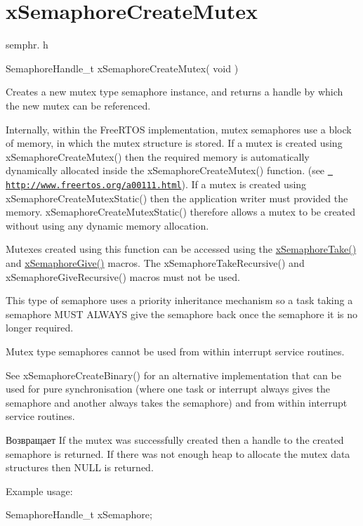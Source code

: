 \hypertarget{group__x_semaphore_create_mutex}{}\section{x\+Semaphore\+Create\+Mutex}
\label{group__x_semaphore_create_mutex}
semphr. h 
\begin{DoxyPre}SemaphoreHandle\_t xSemaphoreCreateMutex( void )\end{DoxyPre}


Creates a new mutex type semaphore instance, and returns a handle by which the new mutex can be referenced.

Internally, within the Free\+R\+T\+OS implementation, mutex semaphores use a block of memory, in which the mutex structure is stored. If a mutex is created using x\+Semaphore\+Create\+Mutex() then the required memory is automatically dynamically allocated inside the x\+Semaphore\+Create\+Mutex() function. (see \href{http://www.freertos.org/a00111.html}{\texttt{ http\+://www.\+freertos.\+org/a00111.\+html}}). If a mutex is created using x\+Semaphore\+Create\+Mutex\+Static() then the application writer must provided the memory. x\+Semaphore\+Create\+Mutex\+Static() therefore allows a mutex to be created without using any dynamic memory allocation.

Mutexes created using this function can be accessed using the \mbox{\hyperlink{semphr_8h_af116e436d2a5ae5bd72dbade2b5ea930}{x\+Semaphore\+Take()}} and \mbox{\hyperlink{semphr_8h_aae55761cabfa9bf85c8f4430f78c0953}{x\+Semaphore\+Give()}} macros. The x\+Semaphore\+Take\+Recursive() and x\+Semaphore\+Give\+Recursive() macros must not be used.

This type of semaphore uses a priority inheritance mechanism so a task \textquotesingle{}taking\textquotesingle{} a semaphore M\+U\+ST A\+L\+W\+A\+YS \textquotesingle{}give\textquotesingle{} the semaphore back once the semaphore it is no longer required.

Mutex type semaphores cannot be used from within interrupt service routines.

See x\+Semaphore\+Create\+Binary() for an alternative implementation that can be used for pure synchronisation (where one task or interrupt always \textquotesingle{}gives\textquotesingle{} the semaphore and another always \textquotesingle{}takes\textquotesingle{} the semaphore) and from within interrupt service routines.

\begin{DoxyReturn}{Возвращает}
If the mutex was successfully created then a handle to the created semaphore is returned. If there was not enough heap to allocate the mutex data structures then N\+U\+LL is returned.
\end{DoxyReturn}
Example usage\+: 
\begin{DoxyPre}
SemaphoreHandle\_t xSemaphore;\end{DoxyPre}



